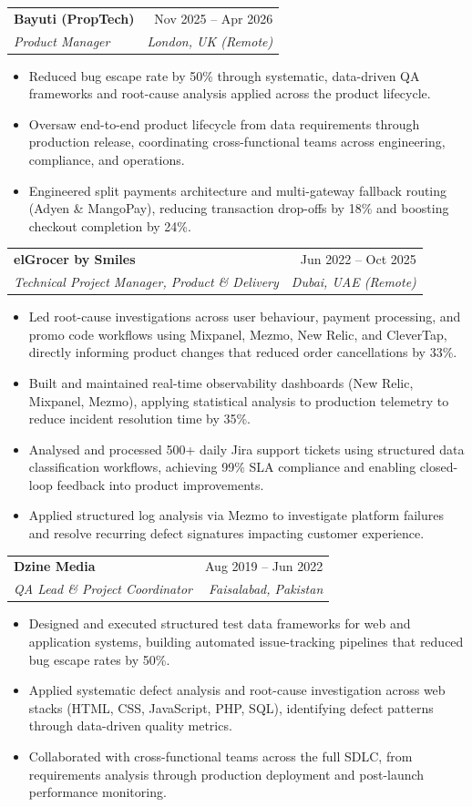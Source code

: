 \documentclass[letterpaper,10pt]{article}
\makeatletter
\newcommand{\resumeItem}[1]{
  \item\small{
    {#1 \vspace{-2pt}}
  }
}
\newcommand{\resumeSubheading}[4]{
  \vspace{-2pt}\item
    \begin{tabular*}{0.97\textwidth}[t]{l@{\extracolsep{\fill}}r}
      \textbf{#1} & #2 \\
      \textit{\small#3} & \textit{\small #4} \\
    \end{tabular*}\vspace{-7pt}
}
\newcommand{\resumeItemListStart}{\begin{itemize}[leftmargin=0.15in]}
\newcommand{\resumeItemListEnd}{\end{itemize}\vspace{-5pt}}
\makeatother
\begin{document}
    \resumeSubheading
      {Bayuti (PropTech)}{Nov 2025 – Apr 2026}
      {Product Manager}{London, UK (Remote)}
      \resumeItemListStart
        \resumeItem{Reduced bug escape rate by 50\% through systematic, data-driven QA frameworks and root-cause analysis applied across the product lifecycle.}
        \resumeItem{Oversaw end-to-end product lifecycle from data requirements through production release, coordinating cross-functional teams across engineering, compliance, and operations.}
        \resumeItem{Engineered split payments architecture and multi-gateway fallback routing (Adyen \& MangoPay), reducing transaction drop-offs by 18\% and boosting checkout completion by 24\%.}
      \resumeItemListEnd

    \resumeSubheading
      {elGrocer by Smiles}{Jun 2022 – Oct 2025}
      {Technical Project Manager, Product \& Delivery}{Dubai, UAE (Remote)}
      \resumeItemListStart
        \resumeItem{Led root-cause investigations across user behaviour, payment processing, and promo code workflows using Mixpanel, Mezmo, New Relic, and CleverTap, directly informing product changes that reduced order cancellations by 33\%.}
        \resumeItem{Built and maintained real-time observability dashboards (New Relic, Mixpanel, Mezmo), applying statistical analysis to production telemetry to reduce incident resolution time by 35\%.}
        \resumeItem{Analysed and processed 500+ daily Jira support tickets using structured data classification workflows, achieving 99\% SLA compliance and enabling closed-loop feedback into product improvements.}
        \resumeItem{Applied structured log analysis via Mezmo to investigate platform failures and resolve recurring defect signatures impacting customer experience.}
      \resumeItemListEnd

    \resumeSubheading
      {Dzine Media}{Aug 2019 – Jun 2022}
      {QA Lead \& Project Coordinator}{Faisalabad, Pakistan}
      \resumeItemListStart
        \resumeItem{Designed and executed structured test data frameworks for web and application systems, building automated issue-tracking pipelines that reduced bug escape rates by 50\%.}
        \resumeItem{Applied systematic defect analysis and root-cause investigation across web stacks (HTML, CSS, JavaScript, PHP, SQL), identifying defect patterns through data-driven quality metrics.}
        \resumeItem{Collaborated with cross-functional teams across the full SDLC, from requirements analysis through production deployment and post-launch performance monitoring.}
      \resumeItemListEnd
\end{document}
